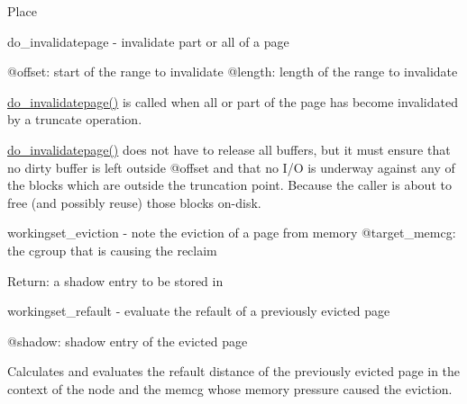 Place

do\+\_\+invalidatepage -\/ invalidate part or all of a page

@offset\+: start of the range to invalidate @length\+: length of the range to invalidate

\mbox{\hyperlink{truncate_8c_ac24d0b0d7749ee82f94a553cde76d7f3}{do\+\_\+invalidatepage()}} is called when all or part of the page has become invalidated by a truncate operation.

\mbox{\hyperlink{truncate_8c_ac24d0b0d7749ee82f94a553cde76d7f3}{do\+\_\+invalidatepage()}} does not have to release all buffers, but it must ensure that no dirty buffer is left outside @offset and that no I/O is underway against any of the blocks which are outside the truncation point. Because the caller is about to free (and possibly reuse) those blocks on-\/disk.

workingset\+\_\+eviction -\/ note the eviction of a page from memory @target\+\_\+memcg\+: the cgroup that is causing the reclaim

Return\+: a shadow entry to be stored in

workingset\+\_\+refault -\/ evaluate the refault of a previously evicted page

@shadow\+: shadow entry of the evicted page

Calculates and evaluates the refault distance of the previously evicted page in the context of the node and the memcg whose memory pressure caused the eviction. 